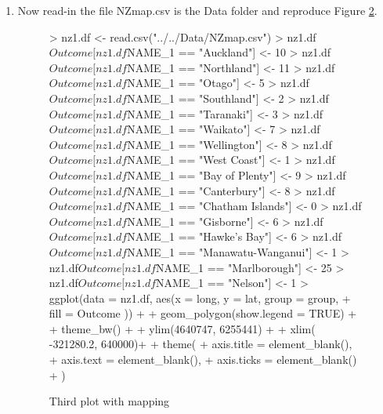 \documentclass[12pt,a4paper]{article}
\begin{document}
\begin{enumerate}
\begin{figure}[h]
\begin{Schunk}
\begin{Sinput}
> ga.n <- with(sports.df, tapply(nerdy.sc, list(gender, age.group), function(x)sum(!is.na(x))))
> ga.stder <- ga.sd/sqrt(ga.n)
> ga.upper <-ga.m + 1.96*ga.stder
> ga.lower <-ga.m - 1.96*ga.stder
> GA.df = data.frame(
+   Age.group = factor(rep(colnames(ga.m), 2), levels = colnames(ga.m)),
+   Gender = rep(rownames(ga.m), c(3, 3)),
+   Mean = c(ga.m[1, ], ga.m[2, ]),
+   Upper = c(ga.upper[1, ], ga.upper[2, ]),
+   Lower = c(ga.lower[1, ], ga.lower[2, ])
+ )
> dodge <- position_dodge(width=0.2)
> ggplot(GA.df, aes(x = Age.group, y = Mean,
+                   color = Gender)) +
+   xlab("Age Group")+
+   ylab("Mean total Nerdy scores") +
+   geom_point(position = dodge) +
+   geom_errorbar(aes(ymax = Upper, ymin = Lower),
+                 width = 0.1, position = dodge)
\end{Sinput}
\end{Schunk}
\caption{Second plot with standard error bars}
  \label{fig:stder2}
\end{figure}

\item Now read-in the file NZmap.csv is the Data folder and reproduce Figure \ref{fig:stder3}. 
\begin{figure}[h]   
 \centering
\begin{Schunk}
\begin{Sinput}
> nz1.df <- read.csv("../../Data/NZmap.csv")
> nz1.df$Outcome[nz1.df$NAME_1 == "Auckland"] <- 10
> nz1.df$Outcome[nz1.df$NAME_1 == "Northland"] <- 11
> nz1.df$Outcome[nz1.df$NAME_1 == "Otago"] <- 5
> nz1.df$Outcome[nz1.df$NAME_1 == "Southland"] <- 2
> nz1.df$Outcome[nz1.df$NAME_1 == "Taranaki"] <- 3
> nz1.df$Outcome[nz1.df$NAME_1 == "Waikato"] <- 7
> nz1.df$Outcome[nz1.df$NAME_1 == "Wellington"] <- 8
> nz1.df$Outcome[nz1.df$NAME_1 == "West Coast"] <- 1
> nz1.df$Outcome[nz1.df$NAME_1 == "Bay of Plenty"] <- 9
> nz1.df$Outcome[nz1.df$NAME_1 == "Canterbury"] <- 8
> nz1.df$Outcome[nz1.df$NAME_1 == "Chatham Islands"] <- 0
> nz1.df$Outcome[nz1.df$NAME_1 == "Gisborne"] <- 6
> nz1.df$Outcome[nz1.df$NAME_1 == "Hawke's Bay"] <- 6
> nz1.df$Outcome[nz1.df$NAME_1 == "Manawatu-Wanganui"] <- 1
> nz1.df$Outcome[nz1.df$NAME_1 == "Marlborough"] <- 25
> nz1.df$Outcome[nz1.df$NAME_1 == "Nelson"] <- 1
> ggplot(data = nz1.df, aes(x = long, y = lat, group = group, 
+                            fill = Outcome )) +
+   geom_polygon(show.legend = TRUE) +
+   theme_bw() +
+   ylim(4640747, 6255441) +
+   xlim( -321280.2, 640000)+
+   theme(
+     axis.title = element_blank(),
+     axis.text = element_blank(),
+     axis.ticks = element_blank()
+   )
\end{Sinput}
\end{Schunk}

\caption{Third plot with mapping}
  \label{fig:stder3}
\end{figure}

\end{enumerate}
\end{document}
